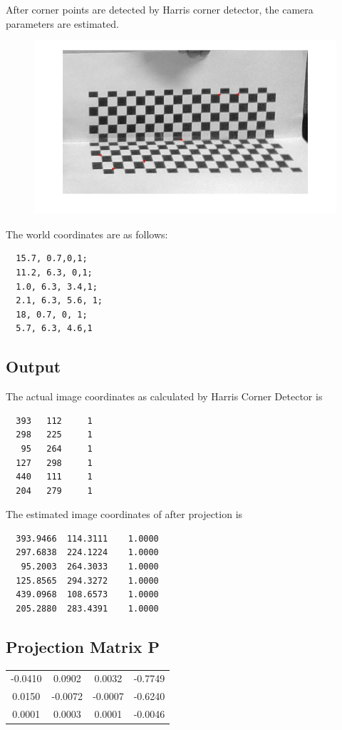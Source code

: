 \documentclass[12pt]{article}
\begin{document}
After corner points are detected by Harris corner detector, the camera parameters are estimated.
\begin{figure}[htp]
\centering
\includegraphics[width=1\textwidth]{harris.jpg}\hfill
\end{figure}
\clearpage
The world coordinates are as follows:
\begin{lstlisting} 
  15.7, 0.7,0,1;
  11.2, 6.3, 0,1;
  1.0, 6.3, 3.4,1;
  2.1, 6.3, 5.6, 1;
  18, 0.7, 0, 1;
  5.7, 6.3, 4.6,1
   \end{lstlisting}
   
\subsection{Output}
The actual image coordinates as calculated by Harris Corner Detector is 
\begin{lstlisting}
  393   112     1
  298   225     1
   95   264     1
  127   298     1
  440   111     1
  204   279     1
   \end{lstlisting}
   
The estimated image coordinates of after projection is
\begin{lstlisting} 
  393.9466  114.3111    1.0000
  297.6838  224.1224    1.0000
   95.2003  264.3033    1.0000
  125.8565  294.3272    1.0000
  439.0968  108.6573    1.0000
  205.2880  283.4391    1.0000
   \end{lstlisting}

\subsection{Projection Matrix P}
\begin{tabular}{|c|c|c|c|}
\hline
  -0.0410  &  0.0902  &  0.0032  & -0.7749 \\
    0.0150 & -0.0072  & -0.0007  & -0.6240 \\
    0.0001  &  0.0003  &  0.0001 &  -0.0046 \\
    \hline
\end{tabular}
\end{document}
